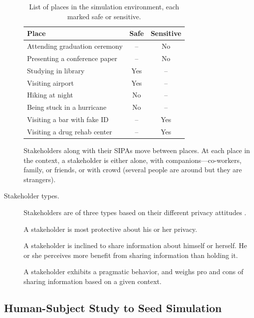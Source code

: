 \begin{description}
\begin{table}[!htb]
\centering
\caption[List of places in the simulation environment]{List of places in the simulation environment, each marked safe or sensitive.}
\label{tab:places}
\begin{tabular}{lcc}
\toprule
Place & Safe & Sensitive \\\midrule
\rowcolor{lightgray!50!}
Attending graduation ceremony & -- & No \\
Presenting a conference paper & -- & No \\
\rowcolor{lightgray!50!}
Studying in library & Yes & -- \\
Visiting airport & Yes & -- \\
\rowcolor{lightgray!50!}
Hiking at night & No & -- \\
Being stuck in a hurricane & No & -- \\
\rowcolor{lightgray!50!}
Visiting a bar with fake ID & -- & Yes \\
Visiting a drug rehab center & -- & Yes \\
\bottomrule
\end{tabular}
\end{table}

Stakeholders along with their SIPAs move between places. At each place in the context, a stakeholder is either alone, with companions---co-workers, family, or friends, or with crowd (several people are around but they are strangers). 

\item[Stakeholder types.] Stakeholders are of three types based on their different privacy attitudes \citet{westin2003social}. 

A  stakeholder is most protective about his or her privacy. 

A  stakeholder is inclined to share information about himself or herself. He or she perceives more benefit from sharing information than holding it. 

A  stakeholder exhibits a pragmatic behavior, and weighs pro and cons of sharing information based on a given context. 

\end{description}

\subsection{Human-Subject Study to Seed Simulation}
\label{sec:survey}

